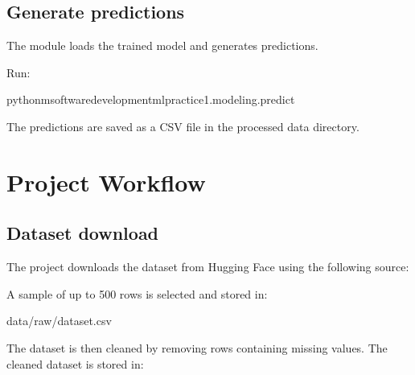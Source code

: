 \documentclass[letterpaper,10pt,english]{sphinxmanual}
\begin{document}
\subsection{Generate predictions}
\label{\detokenize{usage:generate-predictions}}
\sphinxAtStartPar
The  module loads the trained model and generates predictions.

\sphinxAtStartPar
Run:

\begin{sphinxVerbatim}[commandchars=\\\{\}]
python\PYGZhy{}msoftware\PYGZus{}development\PYGZus{}ml\PYGZus{}practice\PYGZus{}1.modeling.predict
\end{sphinxVerbatim}

\sphinxAtStartPar
The predictions are saved as a CSV file in the processed data directory.

\sphinxstepscope


\section{Project Workflow}
\label{\detokenize{workflow:project-workflow}}\label{\detokenize{workflow::doc}}

\subsection{Dataset download}
\label{\detokenize{workflow:dataset-download}}
\sphinxAtStartPar
The project downloads the dataset from Hugging Face using the following
source:

\begin{sphinxVerbatim}[commandchars=\\\{\}]
  
\end{sphinxVerbatim}

\sphinxAtStartPar
A sample of up to 500 rows is selected and stored in:

\begin{sphinxVerbatim}[commandchars=\\\{\}]
data/raw/dataset.csv
\end{sphinxVerbatim}

\sphinxAtStartPar
The dataset is then cleaned by removing rows containing missing values.
The cleaned dataset is stored in:
\end{document}
